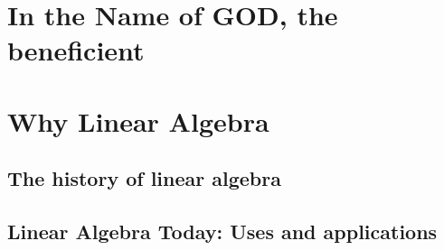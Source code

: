 \usepackage{lipsum}

\usepackage{algorithm}
\usepackage{algpseudocode}
\usepackage{amsmath}




\coverpage{\TITLE}{\SUBTITLE}{\AUTHOR}{\DATE}{\SUBJECT}
\newpage
\tableofcontents
%
%

\part{In the Name of GOD, the beneficient}



\part{Why Linear Algebra}
\newpage
\chapter{The history of linear algebra} \label{ch:lorem}

\newpage
\chapter{Linear Algebra Today: Uses and applications }\label{ch:ipsum}



